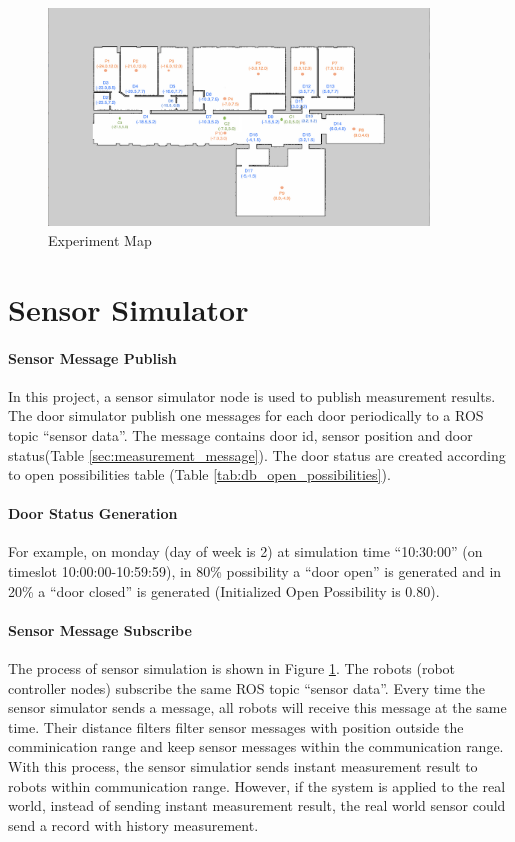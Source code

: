 \begin{figure}[htbp]
    \centering
    \includegraphics[width = 0.9\textwidth]{content/images/ch5/door_station_points.png}
    \caption{Experiment Map}
    \label{fig:exp_map}
\end{figure}



\section{Sensor Simulator}
\label{sec:sensor_simulatior}

\paragraph{Sensor Message Publish}
In this project, a sensor simulator node is used to publish measurement results. The door simulator publish one messages for each door periodically to a ROS topic ``sensor data''. The message contains door id, sensor position and door status(Table \ref{sec:measurement_message}). The door status are created according to open possibilities table (Table \ref{tab:db_open_possibilities}). 


\paragraph{Door Status Generation}
For example, on monday (day of week is 2) at simulation time ``10:30:00'' (on timeslot 10:00:00-10:59:59), in 80\% possibility a ``door open'' is generated and in 20\% a ``door closed'' is generated (Initialized Open Possibility is 0.80).


\paragraph{Sensor Message Subscribe}
The process of sensor simulation is shown in Figure \ref{sec:sensor_simulatior}. The robots (robot controller nodes) subscribe the same ROS topic ``sensor data''. Every time the sensor simulator sends a message, all robots will receive this message at the same time. Their distance filters filter sensor messages with position outside the comminication range and keep sensor messages within the communication range. With this process, the sensor simulatior sends instant measurement result to robots within communication range. However, if the system is applied to the real world, instead of sending instant measurement result, the real world sensor could send a record with history measurement.

